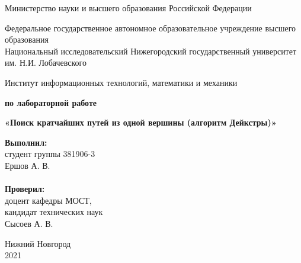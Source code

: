 \documentclass{report}
\begin{document}
\begin{titlepage}

\begin{center}
Министерство науки и высшего образования Российской Федерации
\end{center}

\begin{center}
Федеральное государственное автономное образовательное учреждение высшего образования \\
Национальный исследовательский Нижегородский государственный университет им. Н.И. Лобачевского
\end{center}

\begin{center}
Институт информационных технологий, математики и механики
\end{center}

\vspace{4em}

\begin{center}
\textbf{ по лабораторной работе} \\
\end{center}
\begin{center}
\textbf{\Large«Поиск кратчайших путей из одной вершины (алгоритм Дейкстры)»} \\
\end{center}

\vspace{4em}

\newbox{\lbox}
\newlength{\maxl}
\setlength{\maxl}{\wd\lbox}
\hfill\parbox{7cm}{
\hspace*{5cm}\hspace*{-5cm}\textbf{Выполнил:} \\ студент группы 381906-3 \\ Ершов А. В.\\
\\
\hspace*{5cm}\hspace*{-5cm}\textbf{Проверил:}\\ доцент кафедры МОСТ, \\ кандидат технических наук \\ Сысоев А. В.\\
}
\vspace{\fill}

\begin{center} Нижний Новгород \\ 2021 \end{center}

\end{titlepage}
\end{document}
